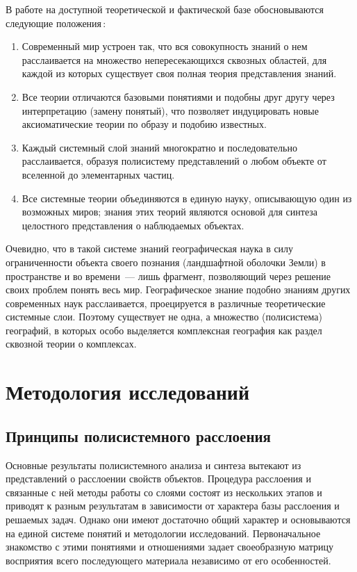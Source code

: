\documentclass[draft,openany,14pt]{extbook}
\begin{document}
В работе на доступной теоретической и фактической базе обосновываются следующие положения\,:

\begin{enumerate}\bfseries\itemsep0pt 
\item Современный мир устроен так, что вся совокупность знаний о нем расслаивается на множество непересекающихся сквозных областей, для каждой из которых существует своя полная теория представления знаний.

\item Все теории отличаются базовыми понятиями и подобны друг другу через интерпретацию (замену понятый), что позволяет индуцировать новые аксиоматические теории по образу и подобию известных.

\item Каждый системный слой знаний многократно и последовательно расслаивается, образуя полисистему представлений о любом объекте от вселенной до элементарных частиц.

\item Все системные теории объединяются в единую науку, описывающую один из возможных миров; знания этих теорий являются основой для синтеза целостного представления о наблюдаемых объектах.
\end{enumerate}

Очевидно, что в такой системе знаний географическая наука в силу ограниченности объекта своего познания (ландшафтной оболочки Земли) в пространстве и во времени~--- лишь фрагмент, позволяющий через решение своих проблем понять весь мир. Географическое знание подобно знаниям других современных наук расслаивается, проецируется в различные теоретические системные слои.  Поэтому существует не одна, а множество (полисистема) географий, в которых особо выделяется комплексная география как раздел сквозной теории о комплексах.

\part{Методология исследований}
\chapter{Принципы полисистемного расслоения}

Основные результаты полисистемного анализа и синтеза вытекают из представлений о расслоении свойств объектов. Процедура расслоения и связанные с ней методы работы со слоями состоят из нескольких этапов и приводят к разным результатам в зависимости от характера базы расслоения и решаемых задач. Однако они имеют достаточно общий характер и основываются на единой системе понятий и методологии исследований. Первоначальное знакомство с этими понятиями и отношениями задает своеобразную матрицу восприятия всего последующего материала независимо от его особенностей.
\end{document}
